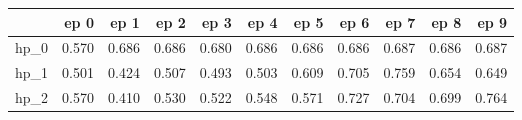 \begin{tabular}{lrrrrrrrrrr}
\toprule
{} &   ep 0 &   ep 1 &   ep 2 &   ep 3 &   ep 4 &   ep 5 &   ep 6 &   ep 7 &   ep 8 &   ep 9 \\
\midrule
hp\_0 &  0.570 &  0.686 &  0.686 &  0.680 &  0.686 &  0.686 &  0.686 &  0.687 &  0.686 &  0.687 \\
hp\_1 &  0.501 &  0.424 &  0.507 &  0.493 &  0.503 &  0.609 &  0.705 &  0.759 &  0.654 &  0.649 \\
hp\_2 &  0.570 &  0.410 &  0.530 &  0.522 &  0.548 &  0.571 &  0.727 &  0.704 &  0.699 &  0.764 \\
\bottomrule
\end{tabular}
